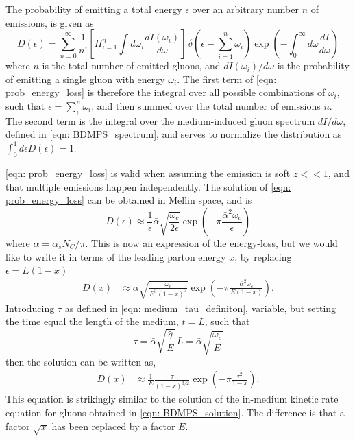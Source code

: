 \documentclass[main.tex]{subfiles}
\begin{document}
The probability of emitting a total energy \(\epsilon\) over an arbitrary number \(n\) of emissions, is given as~\cite{Tomography_of_QCD_matter, JET_PHYSICS_HEAVYIONCOLLISIONS, Quenching_hadron_spectra_media}
\begin{equation}\label{eqn: prob_energy_loss}
    D(\epsilon) = \sum_{n=0}^\infty \frac{1}{n!} \left[\Pi_{i=1}^n \int d \omega_i \frac{dI(\omega_i)}{d\omega} \right] \, \delta\left(\epsilon- \sum_{i=1}^n \omega_i\right)  \exp (-\int_0^\infty d\omega \frac{dI}{d\omega})
\end{equation}
where \(n\) is the total number of emitted gluons, and \(dI(\omega_i)/d\omega\) is the probability of emitting a single gluon with energy \(\omega_i\). The first term of \autoref{eqn: prob_energy_loss} is therefore the integral over all possible combinations of \(\omega_i\), such that \(\epsilon = \sum_i^n\omega_i\), and then summed over the total number of emissions \(n\). The second term is the integral over the medium-induced gluon spectrum \(dI/d\omega\), defined in \autoref{eqn: BDMPS_spectrum}, and serves to normalize the distribution as \(\int_0^1 d\epsilon D(\epsilon) = 1\). 

\autoref{eqn: prob_energy_loss} is valid when assuming the emission is soft \(z<<1\), and that multiple emissions happen independently. The solution of \autoref{eqn: prob_energy_loss} can be obtained in Mellin space, and is 
\begin{equation}
    D(\epsilon) \approx \frac{1}{\epsilon} \bar \alpha \sqrt{\frac{\omega_c}{2\epsilon}} \exp(-\pi \frac{\bar{\alpha}^2 \omega_c}{\epsilon})
\end{equation}
where \(\bar \alpha = \alpha_s N_C/\pi\). This is now an expression of the energy-loss, but we would like to write it in terms of the leading parton energy \(x\), by replacing \(\epsilon = E(1-x)\)
\begin{align}
    D(x) &\approx \bar \alpha \sqrt{\frac{\omega_c}{E^3(1-x)^3}} \exp(-\pi \frac{\bar{\alpha}^2 \omega_c}{E(1-x)}).
\end{align}
Introducing \(\tau\) as defined in \autoref{eqn: medium_tau_definiton}, variable, but setting the time equal the length of the medium, \(t=L\), such that
\begin{equation}
    \tau = \bar \alpha \sqrt{\frac{\hat q}{E}}\, L = \bar \alpha \sqrt{\frac{\omega_c}{E}}
\end{equation}
then the solution can be written as, 
\begin{align}\label{eqn: leading_solution_supersimple1}
    D(x) &\approx \frac{1}{E} \frac{\tau}{(1-x)^{3/2}} \exp(-\pi \frac{\tau^2 }{1-x}).
\end{align}
This equation is strikingly similar to the solution of the in-medium kinetic rate equation for gluons obtained in \autoref{eqn: BDMPS_solution}. The difference is that a factor \(\sqrt{x}\) has been replaced by a factor \(E\).
\end{document}
